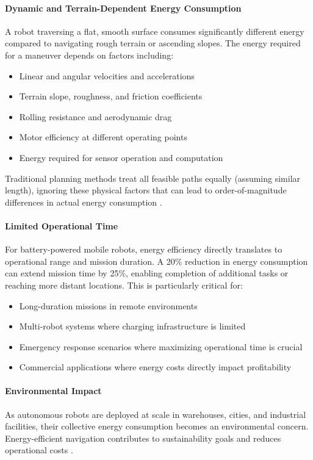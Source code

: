 \paragraph{Dynamic and Terrain-Dependent Energy Consumption}
A robot traversing a flat, smooth surface consumes significantly different energy compared to navigating rough terrain or ascending slopes. The energy required for a maneuver depends on factors including:
\begin{itemize}
    \item Linear and angular velocities and accelerations
    \item Terrain slope, roughness, and friction coefficients
    \item Rolling resistance and aerodynamic drag
    \item Motor efficiency at different operating points
    \item Energy required for sensor operation and computation
\end{itemize}

Traditional planning methods treat all feasible paths equally (assuming similar length), ignoring these physical factors that can lead to order-of-magnitude differences in actual energy consumption \cite{Mei2005, Tokekar2014}.

\paragraph{Limited Operational Time}
For battery-powered mobile robots, energy efficiency directly translates to operational range and mission duration. A 20\% reduction in energy consumption can extend mission time by 25\%, enabling completion of additional tasks or reaching more distant locations. This is particularly critical for:
\begin{itemize}
    \item Long-duration missions in remote environments
    \item Multi-robot systems where charging infrastructure is limited
    \item Emergency response scenarios where maximizing operational time is crucial
    \item Commercial applications where energy costs directly impact profitability
\end{itemize}

\paragraph{Environmental Impact}
As autonomous robots are deployed at scale in warehouses, cities, and industrial facilities, their collective energy consumption becomes an environmental concern. Energy-efficient navigation contributes to sustainability goals and reduces operational costs \cite{Barrientos2011}.


